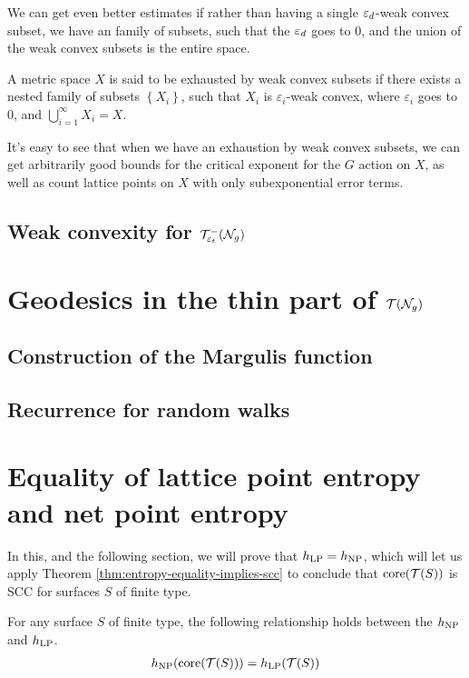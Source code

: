 \documentclass[12pt, reqno]{amsart}
\begin{document}
We can get even better estimates if rather than having a single $\varepsilon_d$-weak convex subset, we have an family of subsets, such that the $\varepsilon_d$ goes to $0$, and the union of the weak convex subsets is the entire space.

\begin{definition}
  A metric space $X$ is said to be exhausted by weak convex subsets if there exists a nested family of subsets $\left\{ X_i \right\}$, such that $X_i$ is $\varepsilon_i$-weak convex, where $\varepsilon_i$ goes to $0$, and $\bigcup_{i=1}^{\infty} X_i = X$.
\end{definition}

It's easy to see that when we have an exhaustion by weak convex subsets, we can get arbitrarily good bounds for the critical exponent for the $G$ action on $X$, as well as count lattice points on $X$ with only subexponential error terms.

\subsection{Weak convexity for $\mathcal{T}_{\varepsilon_t}^{-}(\mathcal{N}_g)$}
\label{sec:weak-conv-syst}



\section{Geodesics in the thin part of $\mathcal{T}(\mathcal{N}_g)$}
\label{sec:recurr-rand-walks}


\subsection{Construction of the Margulis function}
\label{sec:constr-marg-funct}

\subsection{Recurrence for random walks}
\label{sec:recurr-rand-walks-1}

\section{Equality of lattice point entropy and net point entropy}
\label{sec:equal-latt-point}


In this, and the following section, we will prove that $h_{\mathrm{LP}} = h_{\mathrm{NP}}$, which will let us apply Theorem \ref{thm:entropy-equality-implies-scc} to conclude that $\mathrm{core}(\mathcal{T}(S))$ is SCC for surfaces $S$ of finite type.
\begin{theorem}
  \label{thm:entropy-equality}
  For any surface $S$ of finite type, the following relationship holds between the $h_{\mathrm{NP}}$ and $h_{\mathrm{LP}}$.
  \begin{align*}
    h_{\mathrm{NP}}(\mathrm{core}(\mathcal{T}(S))) = h_{\mathrm{LP}}(\mathcal{T}(S))
  \end{align*}
\end{theorem}
\end{document}
